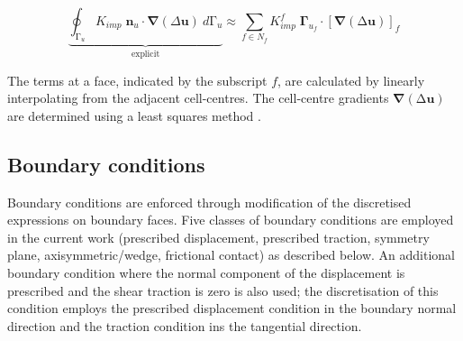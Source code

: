 \documentclass[sn-mathphys,Numbered]{sn-jnl}%
\newcommand{\bb}{\boldsymbol}
\begin{document}
\begin{equation} \label{eq:diffusion_exp}
	    \underbrace{ \oint_{\mathrm{\Gamma}_u}{K_{imp} \; \bb{n}_u\cdot \bb{\nabla} \left(\Delta\bb{u}\right)}\ d\mathrm{\Gamma}_u }_{\text {explicit}}
	\approx
	\sum_{f \in N_f} K_{imp}^f \; \bb{\Gamma}_{u_f} \cdot \left[\bb{\nabla}\left(\mathrm{\Delta}\bb{u}\right)\right]_f
\end{equation}

The terms at a face, indicated by the subscript $f$, are calculated by linearly interpolating from the adjacent cell-centres.
The cell-centre gradients $\bb{\nabla}\left(\mathrm{\Delta}\bb{u}\right)$ are determined using a least squares method \cite{noauthor_openfoam_2015}.



\subsection{Boundary conditions}
Boundary conditions are enforced through modification of the discretised expressions on boundary faces.
Five classes of boundary conditions are employed in the current work (prescribed displacement, prescribed traction, symmetry plane, axisymmetric/wedge, frictional contact) as described below.
An additional boundary condition where the normal component of the displacement is prescribed and the shear traction is zero is also used; the discretisation of this condition employs the prescribed displacement condition in the boundary normal direction and the traction condition ins the tangential direction.
\end{document}
